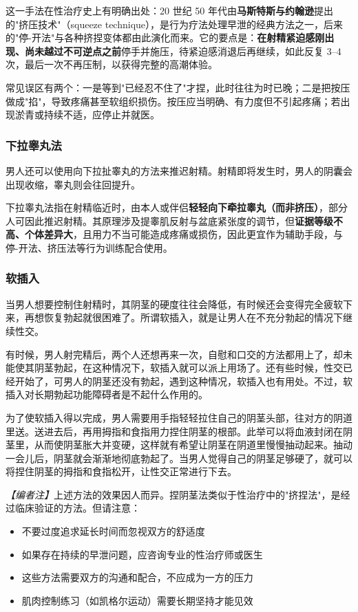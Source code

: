 \documentclass[12pt,UTF8]{ctexbook}
\begin{document}
\vspace{0.5em}

这一手法在性治疗史上有明确出处：20 世纪 50 年代由\textbf{马斯特斯与约翰逊}提出的"挤压技术"（squeeze technique），是行为疗法处理早泄的经典方法之一，后来的"停-开法"与各种挤捏变体都由此演化而来。它的要点是：\textbf{在射精紧迫感刚出现、尚未越过不可逆点之前}停手并施压，待紧迫感消退后再继续，如此反复 3--4 次，最后一次不再压制，以获得完整的高潮体验。

常见误区有两个：一是等到"已经忍不住了"才捏，此时往往为时已晚；二是把按压做成"掐"，导致疼痛甚至软组织损伤。按压应当明确、有力度但不引起疼痛；若出现淤青或持续不适，应停止并就医。

\subsubsection{下拉睾丸法}

男人还可以使用向下拉扯睾丸的方法来推迟射精。射精即将发生时，男人的阴囊会出现收缩，睾丸则会往回提升。

\vspace{0.5em}

下拉睾丸法指在射精临近时，由本人或伴侣\textbf{轻轻向下牵拉睾丸（而非挤压）}，部分人可因此推迟射精。其原理涉及提睾肌反射与盆底紧张度的调节，但\textbf{证据等级不高、个体差异大}，且用力不当可能造成疼痛或损伤，因此更宜作为辅助手段，与停-开法、挤压法等行为训练配合使用。

\subsubsection{软插入}

当男人想要控制住射精时，其阴茎的硬度往往会降低，有时候还会变得完全疲软下来，再想恢复勃起就很困难了。所谓软插入，就是让男人在不充分勃起的情况下继续性交。

有时候，男人射完精后，两个人还想再来一次，自慰和口交的方法都用上了，却未能使其阴茎勃起，在这种情况下，软插入就可以派上用场了。还有些时候，性交已经开始了，可男人的阴茎还没有勃起，遇到这种情况，软插入也有用处。不过，软插入对长期勃起功能障碍者是不起什么作用的。

为了使软插入得以完成，男人需要用手指轻轻拉住自己的阴茎头部，往对方的阴道里送。送进去后，再用拇指和食指用力捏住阴茎的根部。此举可以将血液封闭在阴茎里，从而使阴茎胀大并变硬，这样就有希望让阴茎在阴道里慢慢抽动起来。抽动一会儿后，阴茎就会渐渐地彻底勃起了。当男人觉得自己的阴茎足够硬了，就可以将捏住阴茎的拇指和食指松开，让性交正常进行下去。

\vspace{0.5em}
\noindent\textit{【编者注】}上述方法的效果因人而异。捏阴茎法类似于性治疗中的"挤捏法"，是经过临床验证的方法。但请注意：
\begin{itemize}
\item 不要过度追求延长时间而忽视双方的舒适度
\item 如果存在持续的早泄问题，应咨询专业的性治疗师或医生
\item 这些方法需要双方的沟通和配合，不应成为一方的压力
\item 肌肉控制练习（如凯格尔运动）需要长期坚持才能见效
\end{itemize}
\end{document}
